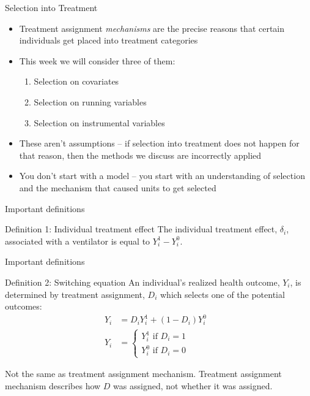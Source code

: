 \documentclass{beamer}
\begin{document}
\begin{frame}{Selection into Treatment}

\begin{itemize}
    \item Treatment assignment \emph{mechanisms} are the precise reasons that certain individuals get placed into treatment categories
    \item This week we will consider three of them:
    	\begin{enumerate}
	\item Selection on covariates
	\item Selection on running variables
	\item Selection on instrumental variables
	\end{enumerate}
     \item These aren't assumptions -- if selection into treatment does not happen for that reason, then the methods we discuss are incorrectly applied
	\item You don't start with a model -- you start with an understanding of selection and the mechanism that caused units to get selected
	\end{itemize}
\end{frame}

\begin{frame}{Important definitions}

    \begin{block}{Definition 1: Individual treatment effect}
      The individual treatment effect,  $\delta_i$, associated with a ventilator is equal to $Y_i^1-Y_i^0$.
    \end{block}
\end{frame}


\begin{frame}{Important definitions}


    \begin{block}{Definition 2: Switching equation}
      An individual's realized health outcome, $Y_i$, is determined by treatment assignment, $D_i$ which selects one of the potential outcomes:
      \begin{eqnarray*}
        Y_i& = D_iY^1_i+(1-D_i)Y^0_i& \\
        Y_i& = \begin{cases}
          Y^1_i\text{ if }D_i=1 \\
          Y^0_i\text{ if }D_i=0
        \end{cases}
      \end{eqnarray*}
    \end{block}
    
    Not the same as treatment assignment mechanism.  Treatment assignment mechanism describes how $D$ was assigned, not whether it was assigned.

\end{frame}
\end{document}
